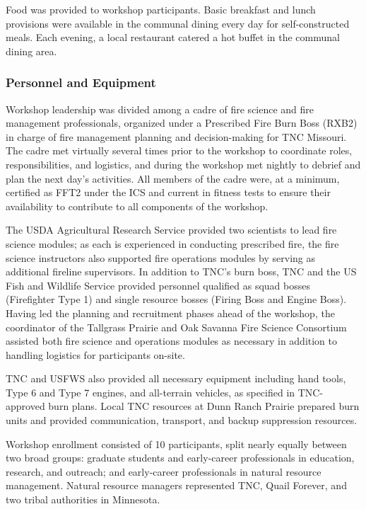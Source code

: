 \documentclass[fire,casereport,accept,moreauthors,pdftex]{Definitions/mdpi}  %
\begin{document}
Food was provided to workshop participants.
Basic breakfast and lunch provisions were available in the communal dining every day for self-constructed meals.
Each evening, a local restaurant catered a hot buffet in the communal dining area.

\subsubsection{Personnel and Equipment}

Workshop leadership was divided among a cadre of fire science and fire management professionals, organized under a Prescribed Fire Burn Boss (RXB2) in charge of fire management planning and decision-making for TNC Missouri.
The cadre met virtually several times prior to the workshop to coordinate roles, responsibilities, and logistics, and during the workshop met nightly to debrief and plan the next day's activities.
All members of the cadre were, at a minimum, certified as FFT2 under the ICS and current in fitness tests to ensure their availability to contribute to all components of the workshop.

The USDA Agricultural Research Service provided two scientists to lead fire science modules; as each is experienced in conducting prescribed fire, the fire science instructors also supported fire operations modules by serving as additional fireline supervisors.
In addition to TNC's burn boss, TNC and the US Fish and Wildlife Service provided personnel qualified as squad bosses (Firefighter Type 1) and single resource bosses (Firing Boss and Engine Boss).
Having led the planning and recruitment phases ahead of the workshop, the coordinator of the Tallgrass Prairie and Oak Savanna Fire Science Consortium assisted both fire science and operations modules as necessary in addition to handling logistics for participants on-site.

TNC and USFWS also provided all necessary equipment including hand tools, Type 6 and Type 7 engines, and all-terrain vehicles, as specified in TNC-approved burn plans.
Local TNC resources at Dunn Ranch Prairie prepared burn units and provided communication, transport, and backup suppression resources.

Workshop enrollment consisted of 10 participants, split nearly equally between two broad groups: graduate students and early-career professionals in education, research, and outreach; and early-career professionals in natural resource management.
Natural resource managers represented TNC, Quail Forever, and two tribal authorities in Minnesota.
\end{document}
